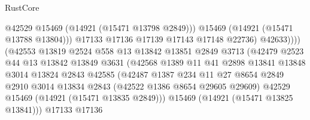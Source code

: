 \begin{lexlean}{RustCore}
\begin{coremodule}
                                            @42529
                                            @15469
                                            (@14921 (@15471 @13798 @2849)))
                                          @15469
                                          (@14921 (@15471 @13788 @13804)))
                                        @17133
                                        @17136
                                        @17139
                                        @17143
                                        @17148
                                        @22736)
                                      @42633))))
                              (@42553
                                @13819
                                @2524
                                @558
                                @13
                                @13842
                                @13851
                                @2849
                                @3713
                                (@42479
                                  @2523
                                  @44
                                  @13
                                  @13842
                                  @13849
                                  @3631
                                  (@42568
                                    @1389
                                    @11
                                    @41
                                    @2898
                                    @13841
                                    @13848
                                    @3014
                                    @13824
                                    @2843
                                    @42585
                                    (@42487
                                      @1387
                                      @234
                                      @11
                                      @27
                                      @8654
                                      @2849
                                      @2910
                                      @3014
                                      @13834
                                      @2843
                                      (@42522 @1386 @8654 @29605 @29609)
                                      @42529
                                      @15469
                                      (@14921 (@15471 @13835 @2849)))
                                    @15469
                                    (@14921 (@15471 @13825 @13841)))
                                  @17133
                                  @17136

\end{coremodule}
\end{lexlean}
